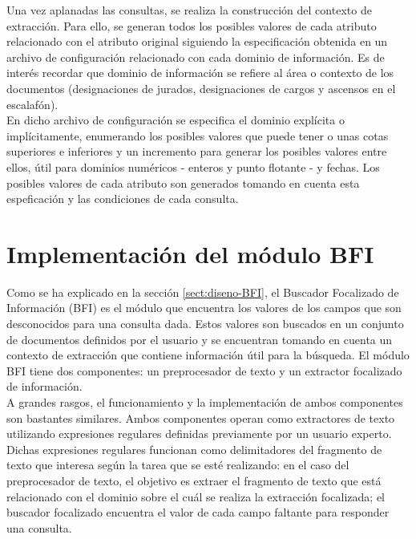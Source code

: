 Una vez aplanadas las consultas, se realiza la construcción del contexto de extracción. Para ello, se generan todos los posibles valores de cada atributo relacionado con el atributo original siguiendo la especificación obtenida en un archivo de configuración relacionado con cada dominio de información. Es de interés recordar que dominio de información se refiere al área o contexto de los documentos (designaciones de jurados, designaciones de cargos y ascensos en el escalafón).\\ 

En dicho archivo de configuración se especifica el dominio explícita o implícitamente, enumerando los posibles valores que puede tener o unas cotas superiores e inferiores y un incremento para generar los posibles valores entre ellos, útil para dominios numéricos - enteros y punto flotante - y fechas. Los posibles valores de cada atributo son generados tomando en cuenta esta espeficación y las condiciones de cada consulta.  \\

\section{Implementación del módulo BFI}\label{sect:implementacion-BFI}

Como se ha explicado en la sección \ref{sect:diseno-BFI}, el Buscador Focalizado de Información (BFI) es el módulo que encuentra los valores de los campos que son desconocidos para una consulta dada. Estos valores son buscados en un conjunto de documentos definidos por el usuario y se encuentran tomando en cuenta un contexto de extracción que contiene información útil para la búsqueda. El módulo BFI tiene dos componentes: un preprocesador de texto y un extractor focalizado de información. \\

A grandes rasgos, el funcionamiento y la implementación de ambos componentes son bastantes similares. Ambos componentes operan como extractores de texto utilizando expresiones regulares definidas previamente por un usuario experto. Dichas expresiones regulares funcionan como delimitadores del fragmento de texto que interesa según la tarea que se esté realizando: en el caso del preprocesador de texto, el objetivo es extraer el fragmento de texto que está relacionado con el dominio sobre el cuál se realiza la extracción focalizada; el buscador focalizado encuentra el valor de cada campo faltante para responder una consulta. \\

